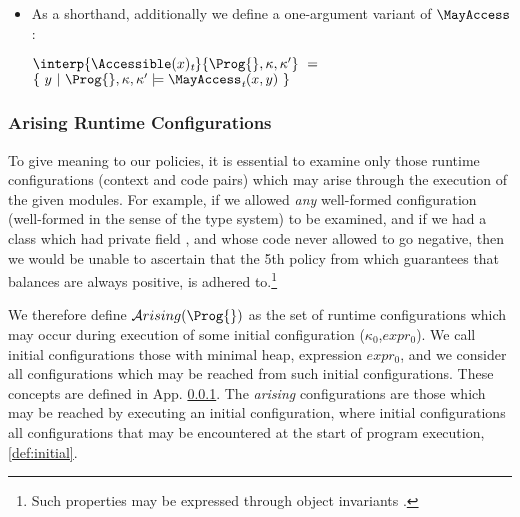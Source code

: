 {\begin{definition}
\begin{itemize}
In both cases above,  if  {{\textit{t}}}=\textsf{pre}, then $\kappa''=\kappa$ , else $\kappa''=\kappa'$.
\item
 As a shorthand, additionally we define a one-argument variant of
$\MayAccess$:

$
\interp{\Accessible(x)_{{\textit{t}}}}{\Prog{}, \kappa,\kappa'}\  = $
\\
$\{\ y\ |\  \Prog{}, \kappa,\kappa'
\models \MayAccess_{{\textit{t}}}(x,y)\ \}
$
\end{itemize}
\end{definition}

 


\subsubsection{Arising Runtime Configurations}
\label{formal:arising}

To give meaning to our   policies,  it is essential
to examine  only those runtime configurations (\ie context and code pairs) which
may arise through the execution of the given modules.
For example, if we allowed {\em any} well-formed configuration (well-formed in the sense of the type system) to be examined, and if we had a  class which had private field , and whose code never allowed   to go negative, then  we would be unable to ascertain that the 5th policy from \cite{ELang} which guarantees that balances are always positive, is adhered to.\footnote{Such properties may be expressed through object invariants \cite{Mey88,LeinoMueller04}.}


We therefore define ${\mathcal A}rising(\Prog{})$ as the set of runtime configurations
which may occur during execution of some initial configuration ($\kappa_0$,$expr_0$).
  We call initial configurations those with minimal heap, expression $expr_0$, and we
  consider all configurations which may be reached from such initial configurations.
These concepts are defined in App. \ref{formal:arising}.
The {\em arising} configurations are those which may be reached by executing an initial configuration, where initial configurations all configurations that may be encountered at the start of program execution, \cf \ref{def:initial}.

}

